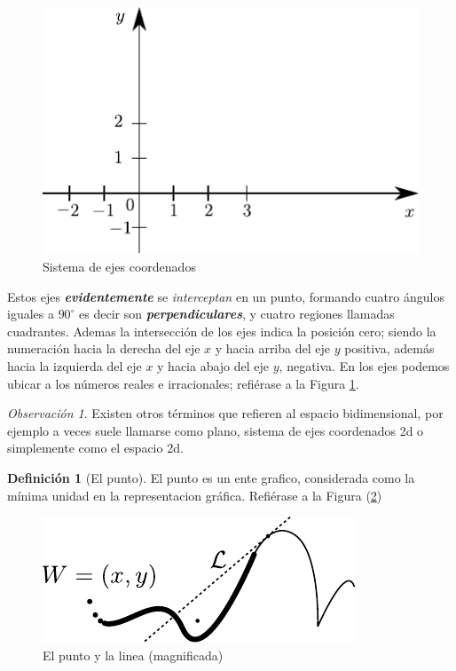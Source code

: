 \documentclass[16pt,]{krantz}
\theoremstyle{definition}
\newtheorem{definition}{Definición}[chapter]
\theoremstyle{definition}
\theoremstyle{definition}
\theoremstyle{definition}
\theoremstyle{remark}
\newtheorem*{remark}{Observación}
\begin{document}
\begin{figure}[!ht]

{\centering \includegraphics{ejes} 

}

\caption{Sistema de ejes coordenados}\label{fig:2d}
\end{figure}

Estos ejes \textbf{\emph{evidentemente}} se \emph{interceptan} en un punto, formando cuatro ángulos iguales a \(90^\circ\) es decir son \textbf{\emph{perpendiculares}}, y cuatro regiones llamadas cuadrantes. Ademas la intersección de los ejes indica la posición cero; siendo la numeración hacia la derecha del eje \(x\) y hacia arriba del eje \(y\) positiva, además hacia la izquierda del eje \(x\) y hacia abajo del eje \(y\), negativa. En los ejes podemos ubicar a los números reales e irracionales; refiérase a la Figura \ref{fig:2d}.

\begin{remark}
{}Existen otros términos que refieren al espacio bidimensional, por ejemplo a veces suele llamarse como plano, sistema de ejes coordenados 2d o simplemente como el espacio 2d.
\end{remark}

\begin{definition}[El punto]
\protect\hypertarget{def:punto}{}{\label{def:punto} {} }El punto es un ente grafico, considerada como la mínima unidad en la representacion gráfica. Refiérase a la Figura (\ref{fig:puntolinea})
\end{definition}

\begin{figure}[!ht]

{\centering \includegraphics{puntolinea} 

}

\caption{El punto y la linea (magnificada)}\label{fig:puntolinea}
\end{figure}
\end{document}
